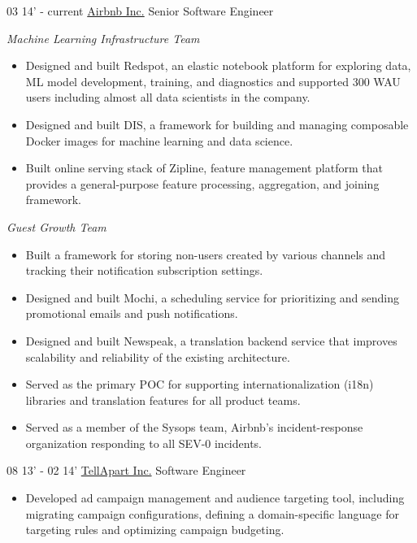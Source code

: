 \documentclass[]{patyoon-cv}
\begin{document}
\begin{entrylist}
  \entry
  {03 14' - current}
  {\href{https://www.airbnb.com/}{Airbnb Inc.}}
  {Senior Software Engineer}
    {\begin{spacing}{0.5} \end{spacing}
      \emph{\small Machine Learning Infrastructure Team}\\
          \begin{itemize}
    \item Designed and built Redspot, an elastic notebook platform for exploring data, ML model development, training, and diagnostics and supported 300 WAU users including almost all data scientists in the company.
    \item Designed and built DIS, a framework for building and managing composable Docker images for machine learning and data science.
    \item Built online serving stack of Zipline, feature management platform that provides a general-purpose feature processing, aggregation, and joining framework.
    \end{itemize}
  \begin{spacing}{1.5} \end{spacing}
      \emph{\small Guest Growth Team}\\
    \begin{itemize}
    \item Built a framework for storing non-users created by various channels and tracking their notification subscription settings.
    \item Designed and built Mochi, a scheduling service for prioritizing and sending promotional emails and push notifications.
    \item Designed and built Newspeak, a translation backend service that improves scalability and reliability of the existing architecture.
    \item Served as the primary POC for supporting internationalization (i18n) libraries and translation features for all product teams.
    \item Served as a member of the Sysops team, Airbnb's incident-response organization responding to all SEV-0 incidents.
    \end{itemize}
  }
  \entry
  {08 13' - 02 14'}
  {\href{https://tellapart.com/}{TellApart Inc.}}
  {Software Engineer}
  {\begin{itemize}
    \item Developed ad campaign management and audience targeting tool, including migrating campaign configurations, defining a domain-specific language for targeting rules and optimizing campaign budgeting.

\end{itemize}}
\end{entrylist}
\end{document}
